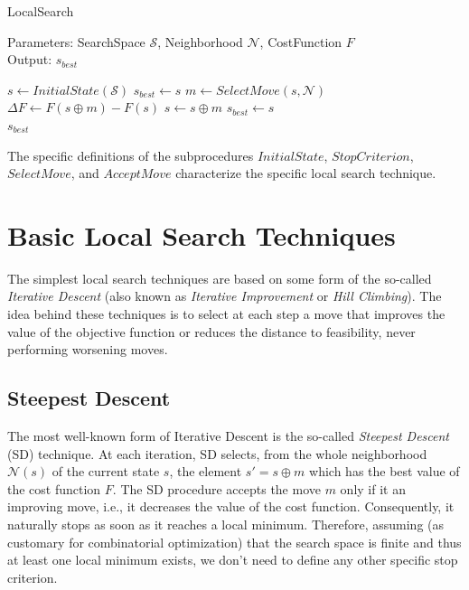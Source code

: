 \begin{algorithm}[ht!]
    \caption{LocalSearch} \label{alg:local-search-pseudocode}   
    Parameters: SearchSpace $\mathcal{S}$, Neighborhood $\mathcal{N}$, CostFunction $F$\\   
    Output: $s_{best}$
    \begin{algorithmic}[1]
            \STATE $s \gets InitialState(\mathcal{S})$
            \STATE $s_{best} \gets s$
                \STATE $m \gets SelectMove(s,\mathcal{N})$
                \STATE $\Delta F \gets F(s \oplus m) - F(s)$
                    \STATE $s \gets s \oplus m$
                \STATE  $s_{best} \gets s$ \\
            \ENDIF
                \ENDIF
            \ENDWHILE
    \RETURN $s_{best}$
    \end{algorithmic}
\end{algorithm}

The specific definitions of the subprocedures $InitialState$, $StopCriterion$, $SelectMove$, and $AcceptMove$ characterize the specific local search technique.

\section{Basic Local Search Techniques}\label{sec:basics}

The simplest local search techniques are based on some
form of the so-called \emph{Iterative Descent} (also known as
\emph{Iterative Improvement} or \emph{Hill Climbing}).  The idea behind these 
techniques is to select at each step a move that improves the value of the objective
function or reduces the distance to feasibility, never
performing worsening moves.


\subsection{Steepest Descent}

The most well-known form of Iterative Descent is the so-called
\emph{Steepest Descent} (SD) technique. At each iteration, SD selects,
from the whole neighborhood $\mathcal{N}(s)$ of the current state
$s$, the element $s' = s \oplus m$ which has the best value of the
cost function $F$.  The SD procedure accepts the move $m$ only if it
an improving move, i.e., it decreases the value of the cost function. 
Consequently, it naturally stops as soon as it reaches a
local minimum. Therefore, assuming (as customary for combinatorial optimization) that the search space is finite and thus at least one local minimum exists, we don't need to define any other specific stop criterion.

